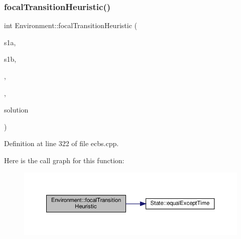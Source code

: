 \subsubsection{\texorpdfstring{focal\+Transition\+Heuristic()}{focalTransitionHeuristic()}\hspace{0.1cm}{\footnotesize\ttfamily [2/2]}}
{\footnotesize\ttfamily int Environment\+::focal\+Transition\+Heuristic (\begin{DoxyParamCaption}\item[{const \hyperlink{struct_state}{State} \&}]{s1a,  }\item[{const \hyperlink{struct_state}{State} \&}]{s1b,  }\item[{int}]{,  }\item[{int}]{,  }\item[{const std\+::vector$<$ \hyperlink{structlib_multi_robot_planning_1_1_plan_result}{Plan\+Result}$<$ \hyperlink{struct_state}{State}, \hyperlink{a__star_8cpp_a8bb1ef53467e4f61410d12822d922498}{Action}, int $>$ $>$ \&}]{solution }\end{DoxyParamCaption})\hspace{0.3cm}{\ttfamily [inline]}}



Definition at line 322 of file ecbs.\+cpp.

Here is the call graph for this function\+:
\nopagebreak
\begin{figure}[H]
\begin{center}
\leavevmode
\includegraphics[width=350pt]{class_environment_a32ad1d8cf07f2104e033065fb95fadf6_cgraph}
\end{center}
\end{figure}
\mbox{\label{class_environment_a666d55a1f0bbc038d3662b75f400faa4}} 
